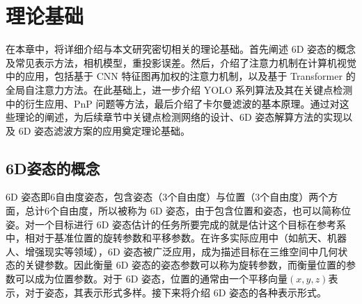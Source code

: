 \chapter{理论基础}
\label{chap:theory}

在本章中，将详细介绍与本文研究密切相关的理论基础。首先阐述 6D 姿态的概念及常见表示方法，相机模型，重投影误差。然后，介绍了注意力机制在计算机视觉中的应用，包括基于 CNN 特征图再加权的注意力机制，以及基于 Transformer 的全局自注意力方法。在此基础上，进一步介绍 YOLO 系列算法及其在关键点检测中的衍生应用、PnP 问题等方法，最后介绍了卡尔曼滤波的基本原理。通过对这些理论的阐述，为后续章节中关键点检测网络的设计、6D 姿态解算方法的实现以及 6D 姿态滤波方案的应用奠定理论基础。

\section{6D姿态的概念}

6D 姿态即6自由度姿态，包含姿态（3个自由度）与位置（3个自由度）两个方面，总计6个自由度，所以被称为 6D 姿态，由于包含位置和姿态，也可以简称位姿。对一个目标进行 6D 姿态估计的任务所要完成的就是估计这个目标在参考系中，相对于基准位置的旋转参数和平移参数。在许多实际应用中（如航天、机器人、增强现实等领域）\cite{Zuo_2024_CVPR,aerospace11070526,NGUYEN2024103459,choi2025robust}，6D 姿态被广泛应用，成为描述目标在三维空间中几何状态的关键参数。因此衡量 6D 姿态的姿态参数可以称为旋转参数，而衡量位置的参数可以成为位置参数。对于 6D 姿态，位置的通常由一个平移向量$(x, y, z)$表示，对于姿态，其表示形式多样。接下来将介绍 6D 姿态的各种表示形式。


